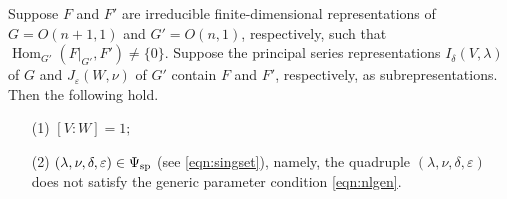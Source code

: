 \begin{proposition}
\label{prop:172009}
Suppose $F$ and $F'$ are irreducible finite-dimensional representations
 of $G=O(n+1,1)$ and $G'=O(n,1)$, 
respectively, 
 such that ${\operatorname{Hom}}_{G'}(F|_{G'}, F') \ne \{0\}$.  
Suppose the principal series representations
 $I_{\delta}(V,\lambda)$ of $G$
 and $J_{\varepsilon}(W,\nu)$ of $G'$
 contain $F$ and $F'$, 
 respectively,
 as subrepresentations. 
Then the following hold.  
\begin{enumerate}
\item[{\rm{(1)}}]
$[V:W]=1;$
\item[{\rm{(2)}}]
$(\lambda, \nu, \delta, \varepsilon) \in \Psi_{{\operatorname{sp}}}$
 (see \eqref{eqn:singset}), 
namely,
 the quadruple $(\lambda, \nu, \delta, \varepsilon)$ does not satisfy
 the generic parameter condition \eqref{eqn:nlgen}.  
\end{enumerate}
\end{proposition}
